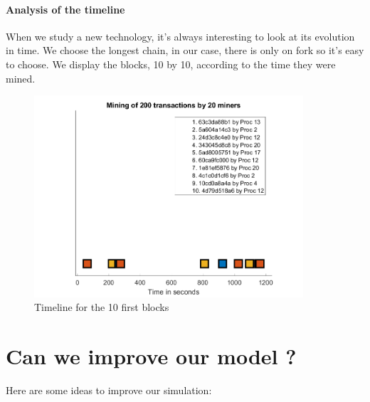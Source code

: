 \paragraph{Analysis of the timeline}

When we study a new technology, it's always interesting to look at its evolution in time. We choose the longest chain, in our case, there is only on fork so it's easy to choose. We display the blocks, 10 by 10, according to the time they were mined.

\begin{figure}[ht]
\centering
\includegraphics[width=10cm]{Figures/timeline_1}
\caption{Timeline for the 10 first blocks}
\end{figure}
\medskip


\section{Can we improve our model ?} \label{improvements}

Here are some ideas to improve our simulation: \newline

